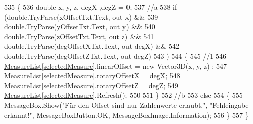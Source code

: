 \begin{DoxyCode}
535         \{
536             \textcolor{keywordtype}{double} x, y, z, degX ,degZ = 0;
537             \textcolor{comment}{//a}
538             \textcolor{keywordflow}{if} (\textcolor{keywordtype}{double}.TryParse(xOffsetTxt.Text, out x) &&
539                 \textcolor{keywordtype}{double}.TryParse(yOffsetTxt.Text, out y) &&
540                 \textcolor{keywordtype}{double}.TryParse(zOffsetTxt.Text, out z) &&
541                 \textcolor{keywordtype}{double}.TryParse(degOffsetXTxt.Text, out degX) &&
542                 \textcolor{keywordtype}{double}.TryParse(degOffsetZTxt.Text, out degZ)
543                 )
544             \{
545                 \textcolor{comment}{//1}
546                 \hyperlink{class_l_i_d_a_r___controller_1_1_main_window_add7555b1a79fa1c17cd18dcf98859b9c}{MeasureList}[\hyperlink{class_l_i_d_a_r___controller_1_1_main_window_a01f677b33ad15d2f0cdf8df1c64cd0e2}{selectedMeasure}].linearOffset = \textcolor{keyword}{new} Vector3D(x, y, z)
      ;
547                 \hyperlink{class_l_i_d_a_r___controller_1_1_main_window_add7555b1a79fa1c17cd18dcf98859b9c}{MeasureList}[\hyperlink{class_l_i_d_a_r___controller_1_1_main_window_a01f677b33ad15d2f0cdf8df1c64cd0e2}{selectedMeasure}].rotaryOffsetX = degX;
548                 \hyperlink{class_l_i_d_a_r___controller_1_1_main_window_add7555b1a79fa1c17cd18dcf98859b9c}{MeasureList}[\hyperlink{class_l_i_d_a_r___controller_1_1_main_window_a01f677b33ad15d2f0cdf8df1c64cd0e2}{selectedMeasure}].rotaryOffsetZ = degZ;
549                 \hyperlink{class_l_i_d_a_r___controller_1_1_main_window_add7555b1a79fa1c17cd18dcf98859b9c}{MeasureList}[\hyperlink{class_l_i_d_a_r___controller_1_1_main_window_a01f677b33ad15d2f0cdf8df1c64cd0e2}{selectedMeasure}].Refresh();
550 
551             \}
552             \textcolor{comment}{//b}
553             \textcolor{keywordflow}{else}
554             \{
555                 MessageBox.Show(\textcolor{stringliteral}{"Für den Offset sind nur Zahlenwerte erlaubt."}, \textcolor{stringliteral}{"Fehleingabe erkannt!"}, 
      MessageBoxButton.OK, MessageBoxImage.Information);
556             \}
557         \}
\end{DoxyCode}
